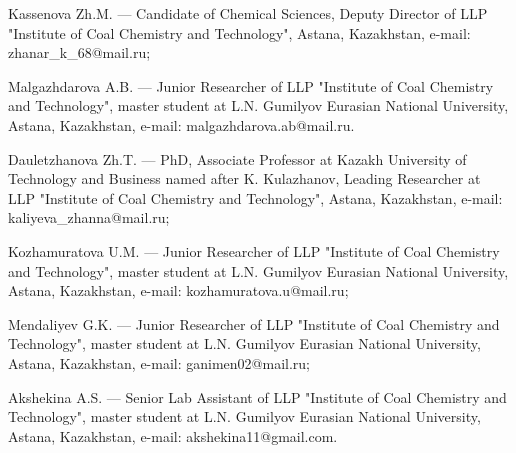 \begin{authorinfo}
Kassenova Zh.M. — Candidate of Chemical Sciences, Deputy Director of
LLP "Institute of Coal Chemistry and Technology", Astana, Kazakhstan,
e-mail: zhanar\_k\_68@mail.ru;

Malgazhdarova A.B. — Junior Researcher of LLP "Institute of Coal
Chemistry and Technology", master student at L.N. Gumilyov Eurasian
National University, Astana, Kazakhstan, e-mail:
malgazhdarova.ab@mail.ru.

Dauletzhanova Zh.T. — PhD, Associate Professor at Kazakh University of
Technology and Business named after K. Kulazhanov, Leading Researcher
at LLP "Institute of Coal Chemistry and Technology", Astana,
Kazakhstan, e-mail: kaliyeva\_zhanna@mail.ru;

Kozhamuratova U.M. — Junior Researcher of LLP "Institute of Coal
Chemistry and Technology", master student at L.N. Gumilyov Eurasian
National University, Astana, Kazakhstan, e-mail:
kozhamuratova.u@mail.ru;

Mendaliyev G.K. — Junior Researcher of LLP "Institute of Coal
Chemistry and Technology", master student at L.N. Gumilyov Eurasian
National University, Astana, Kazakhstan, e-mail: ganimen02@mail.ru;

Akshekina A.S. — Senior Lab Assistant of LLP "Institute of Coal
Chemistry and Technology", master student at L.N. Gumilyov Eurasian
National University, Astana, Kazakhstan, e-mail: akshekina11@gmail.com.
\end{authorinfo}
